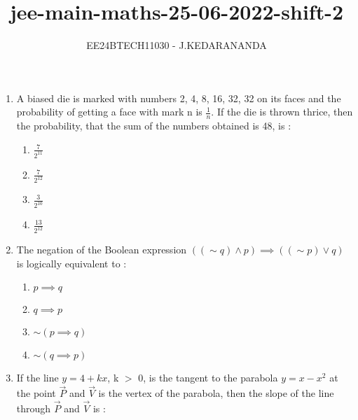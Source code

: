 \documentclass[journal]{IEEEtran}
\renewcommand{\thefigure}{\theenumi}
\renewcommand{\thetable}{\theenumi}
\numberwithin{equation}{enumi}
\numberwithin{figure}{enumi}
\renewcommand{\thetable}{\theenumi}
\begin{document}

\vspace{3cm}

\title{jee-main-maths-25-06-2022-shift-2}
\author{EE24BTECH11030 - J.KEDARANANDA}
{\let\newpage\relax\maketitle}
\renewcommand{\thefigure}{\theenumi}
\renewcommand{\thetable}{\theenumi}
\begin{enumerate}
    \item A biased die is marked with numbers 2, 4, 8, 16, 32, 32 on its faces and the probability of getting a face with mark n is $\frac{1}{n}$. If the die is thrown thrice, then the probability, that the sum of the numbers obtained is 48, is :  \\ 
    \begin{multicols}{4}
    \begin{enumerate}
        \item $\frac{7}{2^{11}}$
        \item $\frac{7}{2^{12}}$
        \item $\frac{3}{2^{10}}$
        \item $\frac{13}{2^{12}}$
    \end{enumerate}
    \end{multicols}
    \bigskip
    \item The negation of the Boolean expression $((\sim q) \land p) \implies ((\sim p) \lor q)$ is logically equivalent to :  \\
    \begin{multicols}{4}
    \begin{enumerate}
        \item $p \implies q$
        \item $q \implies p$
        \item $\sim (p \implies q)$
        \item $\sim (q \implies p)$
    \end{enumerate} 
    \end{multicols}
    \bigskip
    \item If the line $y = 4 + kx$, k $>$ 0, is the tangent to the parabola $y = x - x^2$ at the point $\vec{P}$ and $\vec{V}$ is the vertex of the parabola, then the slope of the line through $\vec{P}$ and $\vec{V}$ is :  \\

\end{enumerate}
\end{document}
